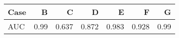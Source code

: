 \begin{tabular}{l|rrrrrr}
Case & B & C & D & E & F & G \\ \hline
AUC & 0.99  &  0.637  &  0.872  &  0.983  &  0.928  &  0.99 
\end{tabular}
